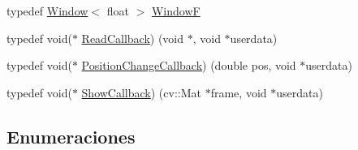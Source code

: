 \begin{DoxyCompactItemize}
\item 
typedef \hyperlink{class_i3_d_1_1_window}{Window}$<$ float $>$ \hyperlink{group___geometric_entities_ga76e43e50a665fdfb754f5825615ffaec}{WindowF}
\item 
typedef void($\ast$ \hyperlink{namespace_i3_d_a7005f50d43ac0b10e2f50ab09994f45b}{Read\+Callback}) (void $\ast$, void $\ast$userdata)
\item 
typedef void($\ast$ \hyperlink{namespace_i3_d_a923a852719565a9e40df22d8cd71281e}{Position\+Change\+Callback}) (double pos, void $\ast$userdata)
\item 
typedef void($\ast$ \hyperlink{namespace_i3_d_a65da91c3d8b7751e061aa6d8462ea890}{Show\+Callback}) (cv\+::\+Mat $\ast$frame, void $\ast$userdata)
\end{DoxyCompactItemize}
\subsection*{Enumeraciones}

